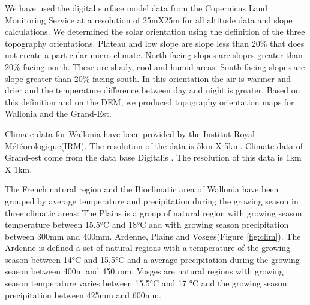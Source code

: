 \documentclass[3p,procedia]{elsarticle}
\begin{document}
We have used the digital surface model data from the Copernicus Land Monitoring Service \citep{DEM_copernicus}  at a resolution of 25mX25m for all altitude data and slope calculations.
We determined the solar orientation using the \cite{Delvaux_galoux} definition of the three topography orientations.
Plateau and low slope are slope less than  20\% that does not create a particular micro-climate. 
North facing slopes are slopes greater than  20\% facing north. 
These are shady, cool and humid areas. 
South facing slopes are slope greater than  20\% facing south. 
In this orientation the air is warmer and drier and the temperature difference between day and night is greater.
Based on this definition and on the DEM, we produced topography orientation  maps for Wallonia and the Grand-Est.


Climate data for Wallonia have been provided by the Institut Royal Météorologique(IRM). The resolution of the data is 5km X 5km. Climate data of  Grand-est come from the data base Digitalis \citep{piedallu_presentation_2014}. The resolution of this data is 1km X 1km.

The French natural region and the Bioclimatic area of Wallonia have been grouped by average temperature and precipitation during the growing season  in three climatic areas: 
The Plains is a group of natural region with growing season temperature between 15.5°C and 18°C and with growing season  precipitation between 300mm and 400mm.
Ardenne, Plains and Vosges(Figure \ref{fig:clim}).
The Ardenne is defined a set of natural regions with a temperature of the growing season between 14°C and 15,5°C and a average precipitation during the growing season between 400m and 450 mm.
Vosges are natural regions with growing season temperature varies between 15.5°C and 17 °C and the growing season precipitation between 425mm and 600mm.


 
\end{document}
